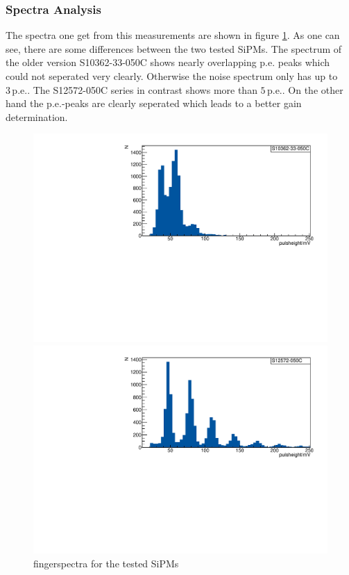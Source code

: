 \subsubsection{Spectra Analysis}
The spectra one get from this measurements are shown in figure \ref{fingerspecs}. As one can see, there are some differences between the two tested SiPMs. The spectrum of the older version S10362-33-050C shows nearly overlapping p.e. peaks which could not seperated very clearly. Otherwise the noise spectrum only has up to $3\,\mathrm{p.e.}$. The S12572-050C series in contrast shows more than $5\,\mathrm{p.e.}$. On the other hand the p.e.-peaks are clearly seperated which leads to a better gain determination.
\begin{figure}[h]
	\centering
	\begin{minipage}[b]{0.49\textwidth}
		\includegraphics[width = .99\textwidth]{Figures/radermacher/S10362-33-050C.pdf}
	\end{minipage}
	\begin{minipage}[b]{0.49\textwidth}
		\includegraphics[width = .99\textwidth]{Figures/radermacher/S12572-050C.pdf}
	\end{minipage}
	\caption{fingerspectra for the tested SiPMs}
	\label{fingerspecs}
\end{figure}
